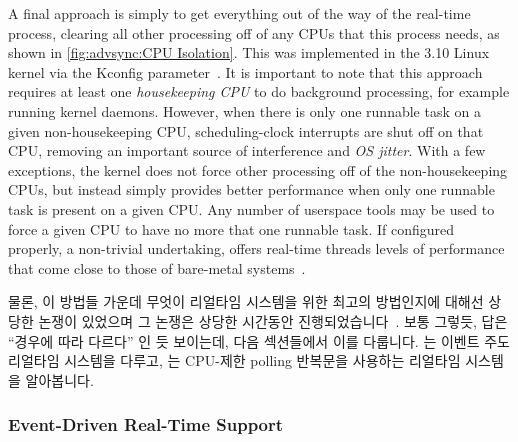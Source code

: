 A final approach is simply to get everything out of the way of the
real-time process, clearing all other processing off of any CPUs that
this process needs, as shown in \cref{fig:advsync:CPU Isolation}.
This was implemented in the 3.10 Linux kernel via the 
Kconfig parameter~\cite{JonCorbet2013NO-HZ-FULL,FredericWeisbecker2013nohz}.
It is important to note that this approach requires at least one
\emph{housekeeping CPU} to do background processing, for example running
kernel daemons.
However, when there is only one runnable task on a given non-housekeeping CPU,
scheduling-clock interrupts are shut off on that CPU, removing an important
source of interference and \emph{OS jitter}.
With a few exceptions, the kernel does not force other processing off of the
non-housekeeping CPUs, but instead simply provides better performance
when only one runnable task is present on a given CPU\@.
Any number of userspace tools may be used to force a given CPU to have
no more that one runnable task.
If configured properly, a non-trivial undertaking, 
offers real-time threads levels of performance that come close to those of
bare-metal systems~\cite{AbdullahAljuhni2018nohzfull}.

\fi

물론, 이 방법들 가운데 무엇이 리얼타임 시스템을 위한 최고의 방법인지에 대해선
상당한 논쟁이 있었으며 그 논쟁은 상당한 시간동안
진행되었습니다~\cite{JonCorbet2004RealTimeLinuxPart1,JonCorbet2004RealTimeLinuxPart2}.
보통 그렇듯, 답은 ``경우에 따라 다르다'' 인 듯 보이는데, 다음 섹션들에서 이를
다룹니다.
는 이벤트 주도 리얼타임 시스템을 다루고,
는 CPU-제한 polling 반복문을 사용하는 리얼타임 시스템을 알아봅니다.

\subsubsection{Event-Driven Real-Time Support}
\label{sec:advsync:Event-Driven Real-Time Support}

